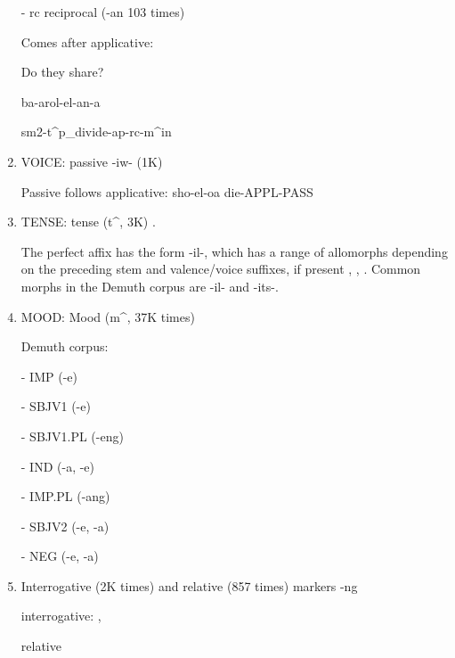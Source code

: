 \documentclass[11pt,letterpaper]{article}
\begin{document}
\begin{enumerate}
    - rc reciprocal (-an 103 times)  \cite[]{doke1967textbook}
    
    Comes after applicative: 
    
    Do they share?
    
    ba-arol-el-an-a
    
    sm2-t\^{}p\_divide-ap-rc-m\^{}in
    
    \item VOICE: passive -iw- (1K)
    
    \cite[]{doke1967textbook} \cite[p. 114]{lombard1969handbook}
    
    Passive follows applicative: sho-el-oa die-APPL-PASS \cite[]{doke1967textbook}
    
    
    \item TENSE: tense (t\^{}, 3K) .
    
    
    The perfect affix has the form -il-, which has a range of allomorphs depending on the preceding stem and valence/voice suffixes, if present \cite[]{doke1967textbook}, \cite[p. 167]{guma1971outline}, \cite[p. 116]{lombard1969handbook}.
    Common morphs in the Demuth corpus are -il- and -its-.
    
     
    \item MOOD: Mood (m\^{}, 37K times)
    
    
    
    Demuth corpus:
    
    - IMP (-e)
    
    - SBJV1 (-e)
    
    - SBJV1.PL (-eng)
    
    - IND (-a, -e)
    
    - IMP.PL (-ang)
    
    - SBJV2 (-e, -a)
    
    - NEG  (-e, -a)
    
    
    \item Interrogative (2K times) and relative (857 times) markers -ng
    
    interrogative: \cite[p. 168]{guma1971handbook}, \cite[, 320]{doke1967textbook}
    
    relative \cite[, 793]{doke1967textbook}
    

\end{enumerate}
\end{document}
